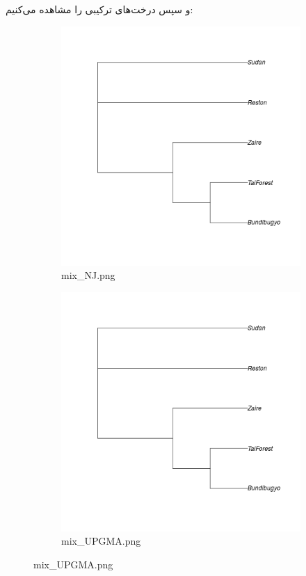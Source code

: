 \documentclass[11pt]{article}
\begin{document}
و سپس درخت‌های ترکیبی را مشاهده می‌کنیم:
\begin{figure}[H]
  \centering
  \begin{subfigure}[b]{0.4\linewidth}
    \includegraphics[width=\linewidth]{../Data/Trees/NJ.png}
    \caption{mix\_NJ.png}
  \end{subfigure}
  \begin{subfigure}[b]{0.4\linewidth}
    \includegraphics[width=\linewidth]{../Data/Trees/UPGMA.png}
    \caption{mix\_UPGMA.png}
  \end{subfigure}
\end{figure}
\end{document}
